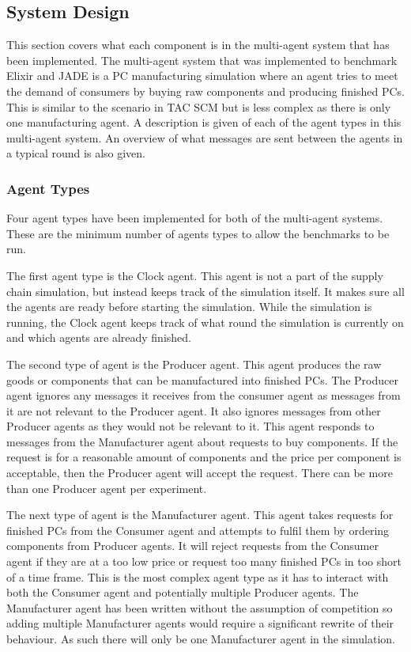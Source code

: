 \subsection{System Design}

This section covers what each component is in the multi-agent system that has been implemented.
The multi-agent system that was implemented to benchmark Elixir and JADE is a PC manufacturing simulation where an agent tries to meet the demand of consumers by buying raw components and producing finished PCs.
This is similar to the scenario in TAC SCM but is less complex as there is only one manufacturing agent.
A description is given of each of the agent types in this multi-agent system.
An overview of what messages are sent between the agents in a typical round is also given.

\subsubsection{Agent Types}

Four agent types have been implemented for both of the multi-agent systems.
These are the minimum number of agents types to allow the benchmarks to be run.

The first agent type is the Clock agent.
This agent is not a part of the supply chain simulation, but instead keeps track of the simulation itself.
It makes sure all the agents are ready before starting the simulation.
While the simulation is running, the Clock agent keeps track of what round the simulation is currently on and which agents are already finished.

The second type of agent is the Producer agent.
This agent produces the raw goods or components that can be manufactured into finished PCs.
The Producer agent ignores any messages it receives from the consumer agent as messages from it are not relevant to the Producer agent.
It also ignores messages from other Producer agents as they would not be relevant to it.
This agent responds to messages from the Manufacturer agent about requests to buy components.
If the request is for a reasonable amount of components and the price per component is acceptable, then the Producer agent will accept the request.
There can be more than one Producer agent per experiment.

The next type of agent is the Manufacturer agent.
This agent takes requests for finished PCs from the Consumer agent and attempts to fulfil them by ordering components from Producer agents.
It will reject requests from the Consumer agent if they are at a too low price or request too many finished PCs in too short of a time frame.
This is the most complex agent type as it has to interact with both the Consumer agent and potentially multiple Producer agents.
The Manufacturer agent has been written without the assumption of competition so adding multiple Manufacturer agents would require a significant rewrite of their behaviour.
As such there will only be one Manufacturer agent in the simulation.

